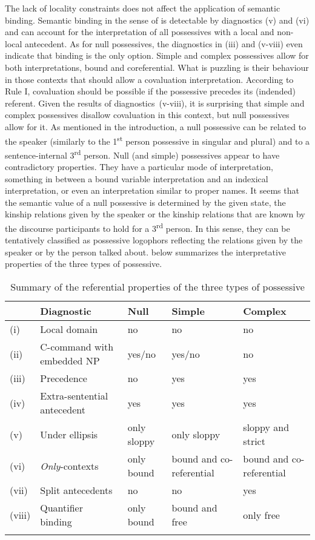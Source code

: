 \documentclass[output=paper]{langsci/langscibook}
\begin{document}
The lack of locality constraints does not affect the application of semantic binding. Semantic binding in the sense of \citet{Reinhart2006} is detectable by diagnostics (v) and (vi) and can account for the interpretation of all possessives with a local and non-local antecedent. As for null possessives, the diagnostics in (iii) and (v-viii) even indicate that binding is the only option. Simple and complex possessives allow for both interpretations, bound and coreferential. What is puzzling is their behaviour in those contexts that should allow a covaluation interpretation. According to Rule I, covaluation should be possible if the possessive precedes its (indended) referent. Given the results of diagnostics~(v-viii), it is surprising that simple and complex possessives disallow covaluation in this context, but null possessives allow for it. As mentioned in the introduction, a null possessive can be related to the speaker (similarly to the 1\textsuperscript{st} person possessive in singular and plural) and to a sentence-internal 3\textsuperscript{rd} person. Null (and simple) possessives appear to have contradictory properties. They have a particular mode of interpretation, something in between a bound variable interpretation and an indexical interpretation, or even an interpretation similar to proper names. It seems that the semantic value of a null possessive is determined by the given state, the kinship relations given by the speaker or the kinship relations that are known by the discourse participants to hold for a 3\textsuperscript{rd} person. In this sense, they can be tentatively classified as possessive logophors reflecting the relations given by the speaker or by the person talked about.  below summarizes the interpretative properties of the three types of possessive.

\begin{table}
\begin{tabularx}{\textwidth}{lQQQQ} 
\lsptoprule
& {Diagnostic} & {Null} & {Simple} & {Complex}\\\midrule
(i) & Local domain & no & no & no\\
(ii) & C-command with embedded NP & yes/no & yes/no & no\\
(iii) & Precedence & no & yes & yes\\
(iv) & Extra-sentential antecedent & yes & yes & yes\\
(v) & Under ellipsis & only sloppy & only sloppy & sloppy and strict\\
(vi) & \textit{Only}{}-contexts & only bound & bound and co-referential & bound and co-referential\\
(vii) & Split antecedents & no & no & yes\\
(viii) & Quantifier binding & only bound & bound and free & only free\\
\lspbottomrule
\end{tabularx}
\caption{Summary of the referential properties of the three types of possessive}
\label{tab:wein:2}
\end{table}
\end{document}
